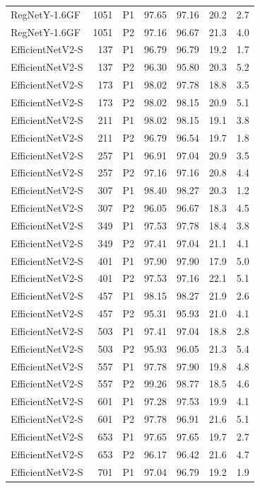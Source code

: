 {\begin{longtable}{lrlrrrr}
RegNetY-1.6GF & 1051 & P1 & 97.65 & 97.16 & 20.2 & 2.7 \\
RegNetY-1.6GF & 1051 & P2 & 97.16 & 96.67 & 21.3 & 4.0 \\
EfficientNetV2-S & 137 & P1 & 96.79 & 96.79 & 19.2 & 1.7 \\
EfficientNetV2-S & 137 & P2 & 96.30 & 95.80 & 20.3 & 5.2 \\
EfficientNetV2-S & 173 & P1 & 98.02 & 97.78 & 18.8 & 3.5 \\
EfficientNetV2-S & 173 & P2 & 98.02 & 98.15 & 20.9 & 5.1 \\
EfficientNetV2-S & 211 & P1 & 98.02 & 98.15 & 19.1 & 3.8 \\
EfficientNetV2-S & 211 & P2 & 96.79 & 96.54 & 19.7 & 1.8 \\
EfficientNetV2-S & 257 & P1 & 96.91 & 97.04 & 20.9 & 3.5 \\
EfficientNetV2-S & 257 & P2 & 97.16 & 97.16 & 20.8 & 4.4 \\
EfficientNetV2-S & 307 & P1 & 98.40 & 98.27 & 20.3 & 1.2 \\
EfficientNetV2-S & 307 & P2 & 96.05 & 96.67 & 18.3 & 4.5 \\
EfficientNetV2-S & 349 & P1 & 97.53 & 97.78 & 18.4 & 3.8 \\
EfficientNetV2-S & 349 & P2 & 97.41 & 97.04 & 21.1 & 4.1 \\
EfficientNetV2-S & 401 & P1 & 97.90 & 97.90 & 17.9 & 5.0 \\
EfficientNetV2-S & 401 & P2 & 97.53 & 97.16 & 22.1 & 5.1 \\
EfficientNetV2-S & 457 & P1 & 98.15 & 98.27 & 21.9 & 2.6 \\
EfficientNetV2-S & 457 & P2 & 95.31 & 95.93 & 21.0 & 4.1 \\
EfficientNetV2-S & 503 & P1 & 97.41 & 97.04 & 18.8 & 2.8 \\
EfficientNetV2-S & 503 & P2 & 95.93 & 96.05 & 21.3 & 5.4 \\
EfficientNetV2-S & 557 & P1 & 97.78 & 97.90 & 19.8 & 4.8 \\
EfficientNetV2-S & 557 & P2 & 99.26 & 98.77 & 18.5 & 4.6 \\
EfficientNetV2-S & 601 & P1 & 97.28 & 97.53 & 19.9 & 4.1 \\
EfficientNetV2-S & 601 & P2 & 97.78 & 96.91 & 21.6 & 5.1 \\
EfficientNetV2-S & 653 & P1 & 97.65 & 97.65 & 19.7 & 2.7 \\
EfficientNetV2-S & 653 & P2 & 96.17 & 96.42 & 21.6 & 4.7 \\
EfficientNetV2-S & 701 & P1 & 97.04 & 96.79 & 19.2 & 1.9 \\

\end{longtable}}
